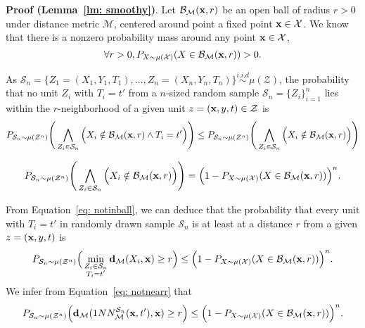 \textbf{Proof (Lemma~\ref{lm: smoothy})}.
Let $\mathcal{B}_{\mathcal{M}}(\mathbf{x},r)$ be an open ball of radius $r>0$ under distance metric $\mathcal{M}$, centered around point a fixed point $\mathbf{x} \in \mathcal{X}$. We know that there is a nonzero probability mass around any point $\mathbf{x} \in \mathcal{X}$,  
\begin{equation}
    \forall r>0, P_{X \sim \mu(\mathcal{X})}(X \in \mathcal{B}_{\mathcal{M}}(\mathbf{x},r))>0.
\end{equation}

As $\mathcal{S}_n = \{Z_1=(X_1,Y_1,T_1),
\dots, Z_n=(X_n,Y_n,T_n)\} \overset{i.i.d}{\sim}\mu(\mathcal{Z})$, the probability that no unit $Z_i$ with $T_i=t'$ from a $n$-sized random sample $\mathcal{S}_n=\{Z_i\}^n_{i=1}$ lies within the $r$-neighborhood of a given unit $z=(\mathbf{x},y,t) \in \mathcal{Z}$ is
\begin{equation}
    \label{eq: notinball}
    P_{\mathcal{S}_n \sim \mu(\mathcal{Z}^n) }\Bigg(
    \bigwedge_{Z_i\in\mathcal{S}_n} \Big(X_i \notin \mathcal{B}_{\mathcal{M}}(\mathbf{x},r) \land T_i = t'\Big) \Bigg)
    \leq 
     P_{\mathcal{S}_n \sim \mu(\mathcal{Z}^n) }\Bigg(
    \bigwedge_{Z_i\in\mathcal{S}_n} \Big(X_i \notin \mathcal{B}_{\mathcal{M}}(\mathbf{x},r) \Big) \Bigg)
\end{equation}

\begin{equation}
    P_{\mathcal{S}_n \sim \mu(\mathcal{Z}^n) }\Bigg(
    \bigwedge_{Z_i\in\mathcal{S}_n} \Big(X_i \notin \mathcal{B}_{\mathcal{M}}(\mathbf{x},r) \Big) \Bigg)
    =
    \Big(1 - P_{X\sim\mu(\mathcal{X})}(X \in \mathcal{B}_{\mathcal{M}}(\mathbf{x},r))\Big)^{n} .
\end{equation}

From Equation~\ref{eq: notinball}, we can deduce that the probability that every unit with $T_i=t'$ in randomly drawn sample $\mathcal{S}_n$ is at least at a distance $r$ from a given $z=(\mathbf{x},y,t)$ is 
\begin{equation}
\label{eq: notnearr}
    P_{\mathcal{S}_n \sim \mu(\mathcal{Z}^n)}\Big(\min_{\substack{Z_i\in\mathcal{S}_n\\T_i=t'}} \mathbf{d}_{\mathcal{M}}(X_i,\mathbf{x}) \geq r \Big) 
    \leq
    \Big(1 - P_{X\sim\mu(\mathcal{X})}(X \in \mathcal{B}_{\mathcal{M}}(\mathbf{x},r))\Big)^{n}.
\end{equation}
We infer from Equation~\ref{eq: notnearr} that
\begin{equation}
\label{eq: notnearrnn}
    P_{\mathcal{S}_n \sim \mu(\mathcal{Z}^n)}\Big(\mathbf{d}_{\mathcal{M}}(1NN^{\mathcal{S}_n}_{\mathcal{M}}(\mathbf{x},t'),\mathbf{x}) \geq r \Big) 
    \leq 
    \Big(1 - P_{X\sim\mu(\mathcal{X})}(X \in \mathcal{B}_{\mathcal{M}}(\mathbf{x},r))\Big)^{n}.
\end{equation}

